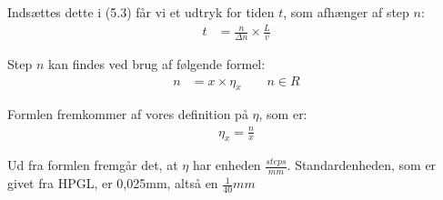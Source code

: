 Indsættes dette i (5.3) får vi et udtryk for tiden $t$, som afhænger af step $n$:
\begin{align}
t &= \frac{n}{\Delta n} \times \frac{L}{v}
\end{align}

Step $n$ kan findes ved brug af følgende formel:
\begin{align}
n &= x \times \eta_x \qquad n \in{R}
\end{align}

Formlen fremkommer af vores definition på $\eta$, som er:
\begin{align*}
\eta_x = \frac{n}{x}
\end{align*}

Ud fra formlen fremgår det, at $\eta$ har enheden $\frac{steps}{mm}$.
Standardenheden, som er givet fra HPGL, er 0,025mm, altså en $\frac{1}{40}mm$


